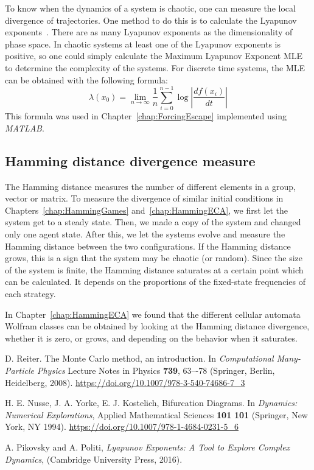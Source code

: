 To know when the dynamics of a system is chaotic, one can measure the local divergence of trajectories. One method to do this is to calculate the Lyapunov exponents~\cite{LyaExp}. There are as many Lyapunov exponents as the dimensionality of phase space. In chaotic systems at least one of the Lyapunov exponents is positive, so one could simply calculate the Maximum Lyapunov Exponent MLE to determine the complexity of the systems. For discrete time systems, the MLE can be obtained with the following formula:
\begin{equation}
\lambda(x_0) = \lim_{n \to \infty}\dfrac{1}{n}\sum_{i=0}^{n-1}\log\left|\dfrac{df(x_i)}{dt}\right|
\end{equation}
This formula was used in Chapter~\ref{chap:ForcingEscape} implemented using \textit{MATLAB}.

\subsection{Hamming distance divergence measure}

The Hamming distance measures the number of different elements in a group, vector or matrix. To measure the divergence of similar initial conditions in Chapters~\ref{chap:HammingGames} and~\ref{chap:HammingECA}, we first let the system get to a steady state. Then, we made a copy of the system and changed only one agent state. After this, we let the systems evolve and measure the Hamming distance between the two configurations. If the Hamming distance grows, this is a sign that the system may be chaotic (or random). Since the size of the system is finite, the Hamming distance saturates at a certain point which can be calculated. It depends on the proportions of the fixed-state frequencies of each strategy.

In Chapter~\ref{chap:HammingECA} we found that the different cellular automata Wolfram classes can be obtained by looking at the Hamming distance divergence, whether it is zero, or grows, and depending on the behavior when it saturates.



\begin{thebibliography}{02}


D. Reiter. The Monte Carlo method, an introduction. In \textit{Computational Many-Particle Physics}
Lecture Notes in  Physics \textbf{739}, 63–-78 (Springer, Berlin, Heidelberg, 2008).
\url{https://doi.org/10.1007/978-3-540-74686-7_3}


H. E. Nusse, J. A. Yorke, E. J. Kostelich, 
Bifurcation Diagrams. In \textit{Dynamics: Numerical Explorations},
Applied Mathematical Sciences \textbf{101} \textbf{101} (Springer, New York, NY 1994).
\url{https://doi.org/10.1007/978-1-4684-0231-5_6}


A. Pikovsky and A. Politi, 
\textit{Lyapunov Exponents: A Tool to Explore Complex Dynamics},
(Cambridge University Press, 2016).




\end{thebibliography}
